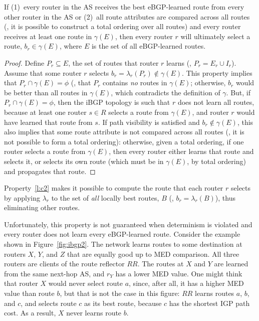 \begin{property}\label{l:c2}
If (1)~every router in the AS receives the best eBGP-learned route from
every other router in the AS or (2)~all route attributes are compared
across all routes (\ie, it is possible to construct a total ordering
over all routes) and every router receives at least one route in
$\gamma(E)$, then every router $r$ will ultimately select a route, $b_r
\in \gamma(E)$, where $E$ is the set of all eBGP-learned routes.
\end{property}
\vspace*{0.1in}
\begin{proof}
Define $P_r \subseteq E$, the set of routes that router $r$ learns (\ie,
$P_r = E_r \cup I_r$).  Assume that some router $r$ selects $b_r =
\lambda_r(P_r) \notin \gamma(E)$.  This property implies that $P_r\cap
\gamma(E) = \phi$ (\ie, that $P_r$ contains {\em no} routes in
$\gamma(E)$; otherwise, $b_r$ would be better than all routes in
$\gamma(E)$, which contradicts the definition of $\gamma$.  But, if $P_r
\cap \gamma(E) = \phi$, then the iBGP topology is such that $r$ does not
learn all routes, because at least one router $s \in R$ selects a route
from $\gamma(E)$, and router $r$ would have learned that route from $s$.
If path visibility is satisfied and $b_r \not\in \gamma(E)$, this also
implies that some route attribute is not compared across all routes
(\ie, it is not possible to form a total ordering): otherwise, given a
total ordering, if one router selects a route from $\gamma(E)$, then every
router either learns that route and selects it, or selects its own route
(which must be in $\gamma(E)$, by total ordering) and propagates that
route.
\end{proof}

\noindent
Property~\ref{l:c2} makes it possible to compute the route that each
router $r$ selects by applying $\lambda_r$ to the set of {\em all}
locally best routes, $B$ (\ie, $b_r = \lambda_r(B)$), thus eliminating
other routes.

Unfortunately, this property is not guaranteed when determinism is
violated and every router does not learn every eBGP-learned route.
Consider the example shown in Figure~\ref{fig:ibgp2}.  The network
learns routes to some destination at routers $X$, $Y$, and $Z$ that are
equally good up to MED comparison. All three routers are clients of the
route reflector $RR$.  The routes at $X$ and $Y$ are learned from the
same next-hop AS, and $r_Y$ has a lower MED value.  One might think that
router $X$ would never select route $a$, since, after all, it has a
higher MED value than route $b$, but that is not the case in this
figure: $RR$ learns routes $a$, $b$, and $c$, and selects route $c$ as
its best route, because $c$ has the shortest IGP path cost.  As a
result, $X$ never learns route $b$.

